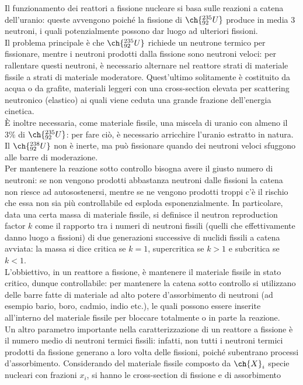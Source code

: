 Il funzionamento dei reattori a fissione nucleare si basa sulle reazioni a catena dell'uranio: queste avvengono poiché la fissione di $ \ch{^{235}_{92} U} $ produce in media 3 neutroni, i quali potenzialmente possono dar luogo ad ulteriori fissioni.\\
Il problema principale è che $ \ch{^{235}_{92} U} $ richiede un neutrone termico per fissionare, mentre i neutroni prodotti dalla fissione sono neutroni veloci: per rallentare questi neutroni, è necessario alternare nel reattore strati di materiale fissile a strati di materiale moderatore. Quest'ultimo solitamente è costituito da acqua o da grafite, materiali leggeri con una cross-section elevata per scattering neutronico (elastico) ai quali viene ceduta una grande frazione dell'energia cinetica.\\
È inoltre necessaria, come materiale fissile, una miscela di uranio con almeno il $ 3\% $ di $ \ch{^{235}_{92} U} $: per fare ciò, è necessario arricchire l'uranio estratto in natura. Il $ \ch{^{238}_{92} U} $ non è inerte, ma può fissionare quando dei neutroni veloci sfuggono alle barre di moderazione.\\
Per mantenere la reazione sotto controllo bisogna avere il giusto numero di neutroni: se non vengono prodotti abbastanza neutroni dalle fissioni la catena non riesce ad autosostenersi, mentre se ne vengono prodotti troppi c'è il rischio che essa non sia più controllabile ed esploda esponenzialmente. In particolare, data una certa massa di materiale fissile, si definisce il neutron reproduction factor $ k $ come il rapporto tra i numeri di neutroni fissili (quelli che effettivamente danno luogo a fissioni) di due generazioni successive di nuclidi fissili a catena avviata: la massa si dice critica se $ k = 1 $, supercritica se $ k > 1 $ e subcritica se $ k < 1 $.\\
L'obbiettivo, in un reattore a fissione, è mantenere il materiale fissile in stato critico, dunque controllabile: per mantenere la catena sotto controllo si utilizzano delle barre fatte di materiale ad alto potere d'assorbimento di neutroni (ad esempio bario, boro, cadmio, indio etc.), le quali possono essere inserite all'interno del materiale fissile per bloccare totalmente o in parte la reazione.\\
Un altro parametro importante nella caratterizzazione di un reattore a fissione è il numero medio di neutroni termici fissili: infatti, non tutti i neutroni termici prodotti da fissione generano a loro volta delle fissioni, poiché subentrano processi d'assorbimento. Considerando del materiale fissile composto da $ \ch{X}_i $ specie nucleari con frazioni $ x_i $, si hanno le cross-section di fissione e di assorbimento
